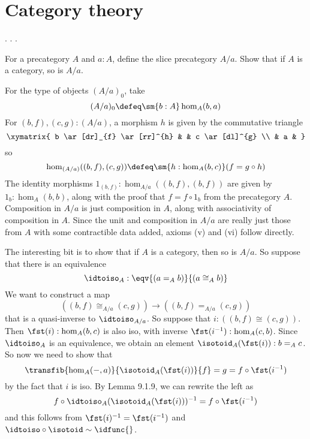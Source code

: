\begin{coqdoccode}
\end{coqdoccode}
\section{Category theory}

\begin{coqdoccode}
\coqdocemptyline
\coqdocnoindent
{}  .\coqdoceol
\coqdocnoindent
{}\coqdocindent{0.50em}
  .\coqdoceol
\coqdocnoindent
{}\coqdocindent{0.50em}
  .\coqdoceol
\coqdocemptyline
\end{coqdoccode}
For a precategory $A$ and $a : A$, define the slice precategory $A / a$.  Show
that if $A$ is a category, so is $A / a$.


 \soln
For the type of objects $(A / a)_{0}$, take 
\[
  (A / a)_{0} \defeq \sm{b : A} \hom_{A}(b, a)
\]
For $(b, f), (c, g) : (A / a)$, a morphism $h$ is given by the commutative
triangle
\[\xymatrix{
  b \ar[dr]_{f} \ar[rr]^{h} & & c \ar[dl]^{g} \\
  & a &
}\]
so
\[
  \hom_{(A/a)}((b, f), (c, g)) \defeq \sm{h : \hom_{A}(b, c)} (f = g \circ h)
\]
The identity morphisms $1_{(b,f)} : \hom_{A/a}((b, f), (b, f))$ are given by
$1_{b} : \hom_{A}(b, b)$, along with the proof that $f = f \circ 1_{b}$ from
the precategory $A$.  Composition in $A / a$ is just composition in $A$,
along with associativity of composition in $A$.  Since the unit and composition
in $A / a$ are really just those from $A$ with some contractible data added,
axioms (v) and (vi) follow directly.


The interesting bit is to show that if $A$ is a category, then so is $A / a$.
So suppose that there is an equivalence
\[
  \idtoiso_{A} : \eqv{(a =_{A} b)}{(a \cong_{A} b)}
\]
We want to construct a map
\[
  \left((b, f) \cong_{A/a} (c, g)\right) \to \left((b, f) =_{A/a} (c, g)\right)
\]
that is a quasi-inverse to $\idtoiso_{A/a}$.  So suppose that $i : ((b, f)
\cong (c, g))$.  Then $\fst(i) : \hom_{A}(b, c)$ is also iso, with inverse
$\fst(i^{-1}) : \hom_{A}(c, b)$.  Since $\idtoiso_{A}$ is an equivalence, we
obtain an element $\isotoid_{A}(\fst(i)) : b =_{A} c$.  So now we need to
show that
\[
  \transfib{\hom_{A}(-, a)}{\isotoid_{A}(\fst(i))}{f} = g = f \circ
  \fst(i^{-1})
\]
by the fact that $i$ is iso.  By Lemma 9.1.9, we can rewrite the left as
\[
f \circ \idtoiso_{A}(\isotoid_{A}(\fst(i)))^{-1} = f \circ
  \fst(i^{-1})
\]
and this follows from $\fst(i)^{-1} = \fst(i^{-1})$ and $\idtoiso \circ
\isotoid \sim \idfunc{}$.


